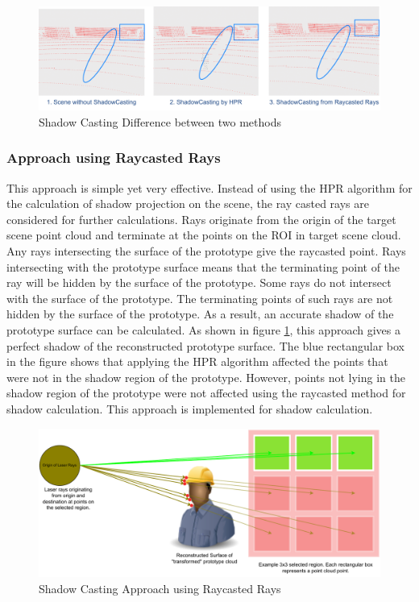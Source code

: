 \begin{figure}[htbp]
    \centering
    \includegraphics[width=0.9\linewidth]{97_graphics/concepts/shadow_casting_difference.pdf}
    \caption{Shadow Casting Difference between two methods}
    \label{fig:concept-shadow_casting_difference}
\end{figure}


\subsubsection{Approach using Raycasted Rays}
This approach is simple yet very effective. Instead of using the HPR algorithm for the calculation of shadow projection on the scene, the ray casted rays are considered for further calculations. Rays originate from the origin of the target scene point cloud and terminate at the points on the ROI in target scene cloud. Any rays intersecting the surface of the prototype give the raycasted point. Rays intersecting with the prototype surface means that the terminating point of the ray will be hidden by the surface of the prototype. Some rays do not intersect with the surface of the prototype. The terminating points of such rays are not hidden by the surface of the prototype. As a result, an accurate shadow of the prototype surface can be calculated. As shown in figure \ref{fig:concept-shadow_casting_difference}, this approach gives a perfect shadow of the reconstructed prototype surface. The blue rectangular box in the figure shows that applying the HPR algorithm affected the points that were not in the shadow region of the prototype. However, points not lying in the shadow region of the prototype were not affected using the raycasted method for shadow calculation. This approach is implemented for shadow calculation.
\begin{figure}[htbp]
    \centering
    \includegraphics[width=0.9\linewidth]{97_graphics/concepts/shadow_casting_by_raycast_method.pdf}
    \caption{Shadow Casting Approach using Raycasted Rays}
    \label{fig:concept-shadow_casting_by_raycast_method}
\end{figure}

